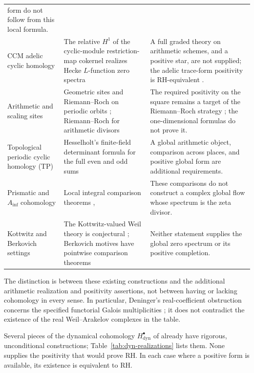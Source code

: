 \documentclass[11pt]{amsart}
\theoremstyle{plain}
\theoremstyle{definition}
\theoremstyle{remark}
\numberwithin{equation}{section}
\begin{document}
{\begin{longtable}{@{}>{\raggedright\arraybackslash}p{}
  >{\raggedright\arraybackslash}p{}
  >{\raggedright\arraybackslash}p{}@{}}
form do not follow from this local formula.\\
CCM adelic cyclic homology &
The relative $H^1$ of the cyclic-module restriction-map cokernel
realizes Hecke $L$-function zero spectra
\cite[Definition~4.10 and Proposition~4.13, pp.~21--23]%
{ConnesConsaniMarcolli2009Weil} &
A full graded theory on arithmetic schemes, and a positive star,
are not supplied; the adelic trace-form positivity is RH-equivalent
\cite[Corollary~6.3, p.~29]{ConnesConsaniMarcolli2009Weil}.\\
Arithmetic and scaling sites &
Geometric sites and Riemann--Roch on periodic orbits
\cite[Thms.~3.9, 5.17]{ConnesConsani2017ScalingGeometry};
Riemann--Roch for arithmetic divisors
\cite[Thm.~1.1]{ConnesConsani2023RiemannRochSpecZ} &
The required positivity on the square remains a target of
the Riemann--Roch strategy
\cite[\S3]{ConnesConsani2018RiemannRoch};
the one-dimensional formulas do not prove it.\\
Topological periodic cyclic homology (TP) &
Hesselholt's finite-field determinant formula for the full
even and odd sums \cite[Thm.~A]{Hesselholt2016THHZeta} &
A global arithmetic object, comparison across places, and
positive global form are additional requirements.\\
Prismatic and $A_{\inf}$ cohomology &
Local integral comparison theorems
\cite[Thm.~1.8]{BhattMorrowScholze2018Integral},
\cite[Thm.~1.8]{BhattScholze2022Prisms} &
These comparisons do not construct a complex global flow
whose spectrum is the zeta divisor.\\
Kottwitz and Berkovich settings &
The Kottwitz-valued Weil theory is conjectural
\cite[Conj.~9.5]{Scholze2018PadicGeometry}; Berkovich motives
have pointwise comparison theorems
\cite[Prop.~1.5]{Scholze2026BerkovichMotives} &
Neither statement supplies the global zero spectrum or its
positive completion.\\
\bottomrule
\end{longtable}
}

The distinction is between these existing constructions and the
additional arithmetic realization and positivity assertions, not
between having or lacking cohomology in every sense. In particular,
Deninger's real-coefficient obstruction concerns the specified
functorial Galois multiplicities
\cite[Thm.~2.13]{Deninger2022NoWeil}; it does not contradict the
existence of the real Weil--Arakelov complexes in the table.

Several pieces of the dynamical cohomology $H^\bullet_{\mathrm{dyn}}$ of
\cite[Conj.~2.3]{FlachMorin2020DeningerWeilArakelov} already have
rigorous, unconditional constructions; Table~\ref{tab:dyn-realizations}
lists them. None supplies the positivity that would prove RH. In each
case where a positive form is available, its existence is equivalent
to RH.
\end{document}
